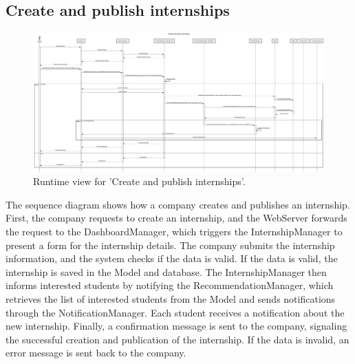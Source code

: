 \subsection{Create and publish internships}
\begin{figure}[H]
    \begin{center}
        \includegraphics[width=0.8\linewidth]{DD/LaTeX/Images/RuntimeView/PublishInternship.png}
        \caption{Runtime view for 'Create and publish internships'.}
        \label{fig:runtime_PublishInternship}%
    \end{center}
\end{figure}

The sequence diagram shows how a company creates and publishes an internship. First, the company requests to create an internship, and the WebServer forwards the request to the DashboardManager, which triggers the InternshipManager to present a form for the internship details. The company submits the internship information, and the system checks if the data is valid. If the data is valid, the internship is saved in the Model and database. The InternshipManager then informs interested students by notifying the RecommendationManager, which retrieves the list of interested students from the Model and sends notifications through the NotificationManager. Each student receives a notification about the new internship. Finally, a confirmation message is sent to the company, signaling the successful creation and publication of the internship. If the data is invalid, an error message is sent back to the company.

